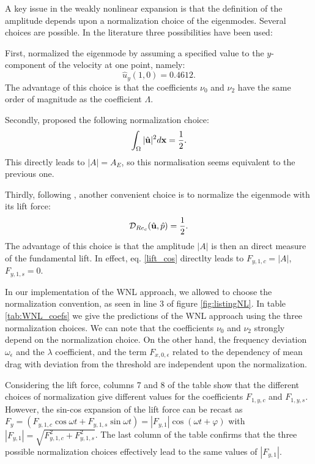 \documentclass[twocolumn,10pt]{asme2ej}
\newcommand{\be}[1]{ \begin{equation} \label{#1}}
\newcommand{\ee}{\end{equation}}
\begin{document}
A key issue in the weakly nonlinear expansion is that the definition of the amplitude depends upon a normalization choice of the eigenmodes. Several choices are possible. In the literature three possibilities have been used:

First, \cite{SippLebedev} normalized the eigenmode by assuming a specified value to the $y$-component of the velocity at one point, namely:
\be{normsipp}
\hat{u}_y(1,0) = 0.4612.
\ee
The advantage of this choice is that the coefficients $\nu_0$ and $\nu_2$ have the same order of magnitude as the coefficient $\Lambda$.

Secondly, \cite{FDR2016} proposed the following normalization choice:
\be{normFDR}
\int_\Omega |\hat{\bf u}|^2 d {\bf x}  = \frac{1}{2}.
\ee
This directly leads to $|A| = A_E$, so this normalisation seems equivalent to the previous one.

Thirdly, following \cite{Fabre2008}, another convenient choice is to normalize the eigenmode with its lift 
force: 
\be{normfabre}
{{\cal D}_{Re_c}(\hat{\bf u},\hat{p}) }=\frac{1}{2}.
\ee
The advantage of this choice is that the amplitude $|A|$ is then an direct measure of the fundamental lift.
In effect, eq. \ref{lift_cos} directlty leads to $F_{y,1,c} = |A|$, $F_{y,1,s} = 0$. 


In our implementation of the WNL approach, we allowed to choose the normalization convention, as seen in line 3 of figure \ref{fig:listingNL}.
In table \ref{tab:WNL_coefs} we give the predictions of the WNL approach using the three normalization choices.
We can note that the coefficients $\nu_0$ and $\nu_2$ strongly depend on the normalization choice. On the other hand, the frequency deviation $\omega_\epsilon$ and the $\lambda$ coefficient, and the term $F_{x,0,\epsilon}$ related to the dependency of mean drag with deviation from the threshold are independent upon the normalization.

Considering the lift force, columns 7 and 8 of the table show that the different choices of normalization give different values for the coefficients $F_{1,y,c}$ and $F_{1,y,s}$. %
However,  the sin-cos expansion of the lift force can be recast as 
$F_y =  (F_{y,1,c} \cos \omega t + F_{y,1,s} \sin \omega t ) =  |F_{y,1}|  \cos (\omega t + \varphi)$ 
with $ |F_{y,1}| =  \sqrt{F_{y,1,c}^2 + F_{y,1,s}^2}$. The last column of the table confirms that the three possible normalization choices effectively lead to the same values of $|F_{y,1}|$.
\end{document}
